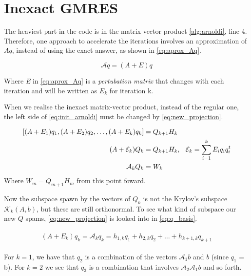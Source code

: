 \section{Inexact GMRES}

The heaviest part in the code is in the matrix-vector product \ref{alg:arnoldi}, line 4. Therefore, one approach to accelerate the iterations involves an approximation of $Aq $, instead of using the exact answer, as shown in \ref{eq:aprox_Aq}.

\begin{equation}\label{eq:aprox_Aq}
    \mathcal{A}q = (A + E)q
\end{equation}

Where \textit{E} in \ref{eq:aprox_Aq} is a \textit{pertubation matrix} that changes with each iteration and will be written as $E_{k}$ for iteration k.

When we realise the inexact matrix-vector product, instead of the regular one, the left side of \ref{eq:init_arnoldi} must be changed by \ref{eq:new_projection}.


\begin{align} \label{eq:new_projection}
    \begin{split}
        [(A + E_{1})q_{1}, (A + E_{2})q_{2},\dots, (A + E_{k})q_{k}] &= Q_{k+1}H_{k}\\
        (A + \mathcal{E}_{k})Q_{k} &= Q_{k+1}H_{k}, \hspace{0.1in} \mathcal{E}_{k} = \sum_{i=1}^{k}E_{i}q_{i}q_{i}^{t}\\
        \mathcal{A}_{k}Q_{k} &= W_{k}
    \end{split}
\end{align}
Where $W_{m} = Q_{m+1}H_{m}$ from this point foward.

Now the subspace spawn by the vectors of $Q_{k}$ is not the Krylov's subspace $\mathcal{K}_{k}(A,b)$, but these are still orthonormal.  To see what kind of subspace our new $Q$ spams, \ref{eq:new_projection} is looked into in \ref{eq:q_basis}.

\begin{align}\label{eq:q_basis}
    \begin{split}
        (A + E_{k})q_{k}=\mathcal{A}_{k} q_{k} = h_{1,k}q_{1} + h_{2,k}q_{2} + \dots + h_{k+1,k}q_{k+1}
    \end{split}
\end{align}

For $k=1$, we have that $q_{2}$ is a combination of the vectors $\mathcal{A}_{1}b$ and $b$ (since $q_{1}$ = b). For $k=2$ we see that $q_{3}$ is a combination that involves $\mathcal{A}_{2} \mathcal{A}_{1}b$ and so forth.

